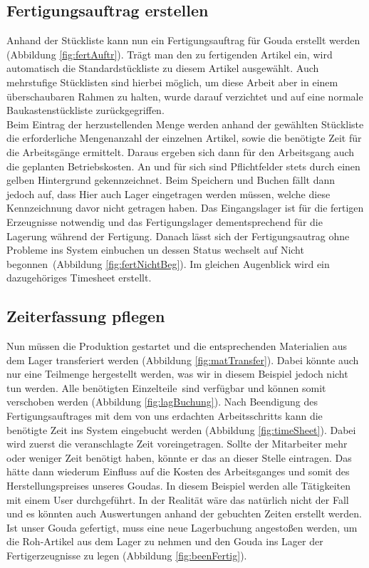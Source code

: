 \subsection{Fertigungsauftrag erstellen}
Anhand der Stückliste kann nun ein Fertigungsauftrag für Gouda erstellt werden (\vgl Abbildung \ref{fig:fertAuftr}). Trägt man den zu fertigenden Artikel ein, wird automatisch die Standardstückliste zu diesem Artikel ausgewählt. Auch mehrstufige Stücklisten sind hierbei möglich, um diese Arbeit aber in einem überschaubaren Rahmen zu halten, wurde darauf verzichtet und auf eine normale Baukastenstückliste zurückgegriffen. \\
Beim Eintrag der herzustellenden Menge werden anhand der gewählten Stückliste die erforderliche Mengenanzahl der einzelnen Artikel, sowie die benötigte Zeit für die Arbeitsgänge ermittelt. Daraus ergeben sich dann für den Arbeitsgang auch die geplanten Betriebskosten.
An und für sich sind Pflichtfelder stets durch einen gelben Hintergrund gekennzeichnet. Beim Speichern und Buchen fällt dann jedoch auf, dass Hier auch Lager eingetragen werden müssen, welche diese Kennzeichnung davor nicht getragen haben. Das Eingangslager ist für die fertigen Erzeugnisse notwendig und das Fertigungslager dementsprechend für die Lagerung während der Fertigung. Danach lässt sich der Fertigungsautrag ohne Probleme ins System einbuchen un dessen Status wechselt auf \glqq Nicht begonnen\grqq\ (\vgl Abbildung \ref{fig:fertNichtBeg}). Im gleichen Augenblick wird ein dazugehöriges Timesheet erstellt.

\subsection{Zeiterfassung pflegen}
Nun müssen die Produktion gestartet und die entsprechenden Materialien aus dem Lager transferiert werden (\vgl Abbildung \ref{fig:matTransfer}). Dabei könnte auch nur eine Teilmenge hergestellt werden, was wir in diesem Beispiel jedoch nicht tun werden. Alle benötigten \glqq Einzelteile\grqq\ sind verfügbar und können somit verschoben werden (\vgl Abbildung \ref{fig:lagBuchung}). Nach Beendigung des Fertigungsauftrages mit dem von uns erdachten Arbeitsschritts kann die benötigte Zeit ins System eingebucht werden (\vgl Abbildung \ref{fig:timeSheet}). Dabei wird zuerst die veranschlagte Zeit voreingetragen. Sollte der Mitarbeiter mehr oder weniger Zeit benötigt haben, könnte er das an dieser Stelle eintragen. Das hätte dann wiederum Einfluss auf die Kosten des Arbeitsganges und somit des Herstellungspreises unseres Goudas. In diesem Beispiel werden alle Tätigkeiten mit einem User durchgeführt. In der Realität wäre das natürlich nicht der Fall und es könnten auch Auswertungen anhand der gebuchten Zeiten erstellt werden. \\
Ist unser Gouda gefertigt, muss eine neue Lagerbuchung angestoßen werden, um die Roh-Artikel aus dem Lager zu nehmen und den Gouda ins Lager der Fertigerzeugnisse zu legen (\vgl Abbildung \ref{fig:beenFertig}).

